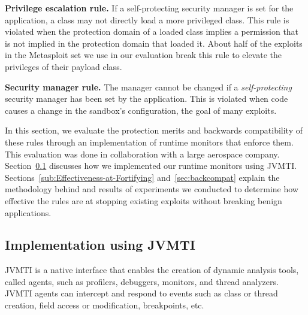 \documentclass{sig-alternate}
\begin{document}
\noindent\textbf{Privilege escalation rule.} If a self-protecting
security manager is set for the application, a class may not directly
load a more privileged class. This rule is violated when the protection
domain of a loaded class implies a permission that is not implied
in the protection domain that loaded it. About half of the exploits in the Metasploit set we use in our evaluation
break this rule to elevate the privileges of their payload
class.

\noindent \textbf{Security manager rule.} The manager cannot
be changed if a \emph{self-protecting} security manager has been set
by the application. This is violated when code causes a change
in the sandbox's configuration, the goal of many exploits.



In this section, we evaluate the protection merits and backwards compatibility
of these rules through an implementation of runtime monitors that
enforce them. This evaluation was done in collaboration with a large aerospace
company.
Section~\ref{sub:Implementation-Using-JVMTI} discusses how we implemented
our runtime monitors using JVMTI. Sections~\ref{sub:Effectiveness-at-Fortifying} and~\ref{sec:backcompat} explain the methodology behind and results of experiments we conducted
to determine how effective the rules are at stopping existing exploits without
breaking benign applications. 

\subsection{Implementation using JVMTI}\label{sub:Implementation-Using-JVMTI}

JVMTI is a native interface that enables the creation of
dynamic analysis tools, called agents, such as profilers, debuggers, monitors, and thread
analyzers. JVMTI agents can intercept and respond to events such as class
or thread creation, field access or modification, breakpoints, etc.
\end{document}
